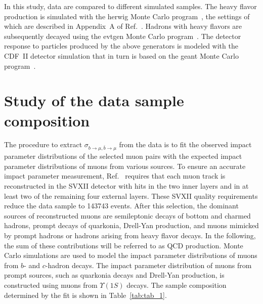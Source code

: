 \documentclass[aps,prd,preprint,floatfix,nofootinbib,superscriptaddress,showpacs,amssymb]{revtex4}
\begin{document}
 In this study, data are compared to different simulated samples. The
 heavy flavor production is  simulated with the {\sc herwig} Monte Carlo
 program~\cite{herwig}, the settings of which are described in Appendix~A
 of Ref.~\cite{bbxs}. Hadrons with heavy flavors  are subsequently 
 decayed using the {\sc evtgen} Monte Carlo program~\cite{evtgen}. 
 The detector response to particles produced by the above generators
 is modeled with the CDF~II detector simulation that in turn is based on 
 the {\sc geant} Monte Carlo program~\cite{geant}.

\section{Study of the data sample composition}\label{sec:ss-inv}
 The procedure to extract $\sigma_{b\rightarrow\mu,\bar{b}\rightarrow \mu}$
 from the data is to fit the observed impact parameter distributions of the 
 selected muon pairs with the expected impact parameter distributions of muons
 from various sources. To ensure an accurate impact parameter measurement,
 Ref.~\cite{bbxs} requires that each muon track is reconstructed in the 
 SVXII detector with hits in the two inner layers and in at least two of
 the remaining four external layers. These SVXII quality requirements 
 reduce the data sample to 143743 events. After this selection, the dominant
 sources of reconstructed muons are semileptonic decays of bottom and
 charmed hadrons, prompt decays of quarkonia, Drell-Yan production, and
 muons mimicked by prompt hadrons or hadrons arising from heavy flavor 
 decays. In the following, the sum of these contributions will be 
 referred to as QCD production. Monte Carlo simulations are used to model
 the impact parameter distributions of muons from $b$- and $c$-hadron decays. 
 The impact parameter distribution of muons from prompt sources, such as
 quarkonia decays and Drell-Yan production, is constructed using muons
 from $\Upsilon(1S)$ decays. The sample composition determined by the fit
 is shown in Table~\ref{tab:tab_1}.
\end{document}
